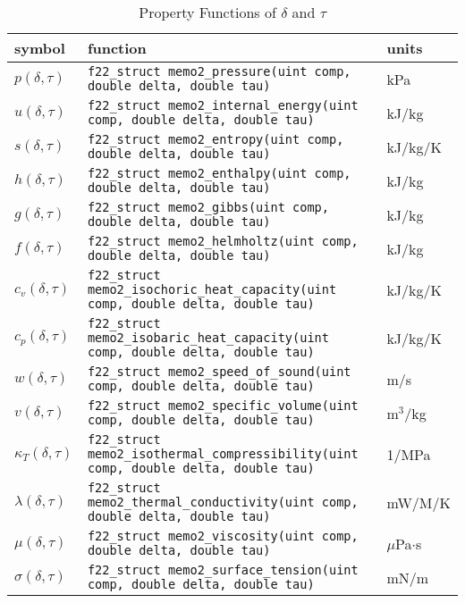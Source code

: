 \documentclass[oneside]{book}
\begin{document}
\begin{table}[h!]
\centering
\caption{Property Functions of $\delta$ and $\tau$}
\begin{tabular}{ l l l }
\hline
symbol & function & units \\
\hline
\hline
$p(\delta, \tau)$ & \texttt{f22\_struct memo2\_pressure(uint comp, double delta, double tau)} & kPa \\ [1ex]
$u(\delta, \tau)$ & \texttt{f22\_struct memo2\_internal\_energy(uint comp, double delta, double tau)} &  kJ/kg \\ [1ex]
$s(\delta, \tau)$ & \texttt{f22\_struct memo2\_entropy(uint comp, double delta, double tau)} &  kJ/kg/K \\ [1ex]
$h(\delta, \tau)$ & \texttt{f22\_struct memo2\_enthalpy(uint comp, double delta, double tau)} &  kJ/kg \\ [1ex]
$g(\delta, \tau)$ & \texttt{f22\_struct memo2\_gibbs(uint comp, double delta, double tau)} &  kJ/kg \\ [1ex]
$f(\delta, \tau)$ & \texttt{f22\_struct memo2\_helmholtz(uint comp, double delta, double tau)} &  kJ/kg \\ [1ex]
$c_v(\delta, \tau)$ & \texttt{f22\_struct memo2\_isochoric\_heat\_capacity(uint comp, double delta, double tau)} &  kJ/kg/K \\ [1ex]
$c_p(\delta, \tau)$ & \texttt{f22\_struct memo2\_isobaric\_heat\_capacity(uint comp, double delta, double tau)} &  kJ/kg/K \\ [1ex]
$w(\delta, \tau)$ & \texttt{f22\_struct memo2\_speed\_of\_sound(uint comp, double delta, double tau)} &  m/s \\ [1ex]
$v(\delta, \tau)$ & \texttt{f22\_struct memo2\_specific\_volume(uint comp, double delta, double tau)} &  m$^3$/kg \\ [1ex]
$\kappa_T(\delta, \tau)$ & \texttt{f22\_struct memo2\_isothermal\_compressibility(uint comp, double delta, double tau)} &  1/MPa \\ [1ex]
$\lambda(\delta, \tau)$ & \texttt{f22\_struct memo2\_thermal\_conductivity(uint comp, double delta, double tau)} &  mW/M/K \\ [1ex]
$\mu(\delta, \tau)$ & \texttt{f22\_struct memo2\_viscosity(uint comp, double delta, double tau)} &  $\mu$Pa$\cdot$s \\ [1ex]
$\sigma(\delta, \tau)$ & \texttt{f22\_struct memo2\_surface\_tension(uint comp, double delta, double tau)} &  mN/m \\ [1ex]
 \hline    
\end{tabular}
\label{table:props_dt}
\end{table}
\end{document}
